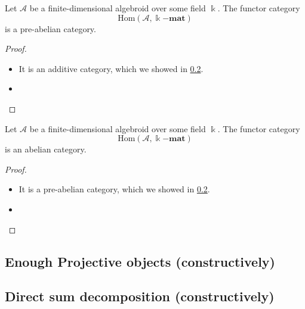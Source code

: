 \begin{lemma}
Let $\mathcal{A}$ be a finite-dimensional algebroid over some field $\Bbbk$. The functor category
\[
\mathrm{Hom}(\mathcal{A},\Bbbk\mathbf{-mat})
\]
is a pre-abelian category.
\begin{proof}
\begin{itemize}
\renewcommand{\labelenumi}{(\theenumi)}
\item It is an additive category, which we showed in \ref{}.
\item
\end{itemize}
\end{proof}
\end{lemma}

\begin{lemma}
Let $\mathcal{A}$ be a finite-dimensional algebroid over some field $\Bbbk$. The functor category
\[
\mathrm{Hom}(\mathcal{A},\Bbbk\mathbf{-mat})
\]
is an abelian category.
\begin{proof}
\begin{itemize}
\renewcommand{\labelenumi}{(\theenumi)}
\item It is a pre-abelian category, which we showed in \ref{}.
\item 
\end{itemize}
\end{proof}
\end{lemma}

\subsection{Enough Projective objects (constructively)}

\subsection{Direct sum decomposition (constructively)}
